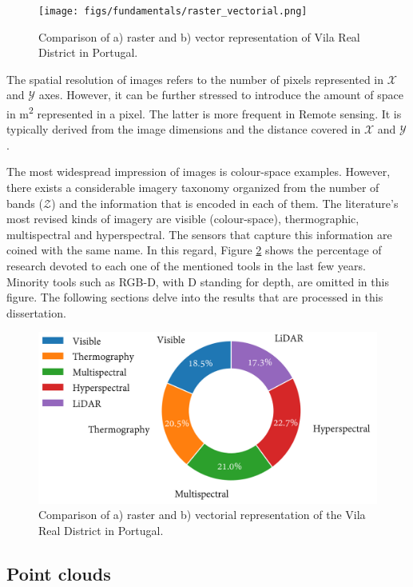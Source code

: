 \begin{figure}[!ht]
	\texttt{[image: figs/fundamentals/raster\_vectorial.png]}
	\caption{Comparison of a) raster and b) vector representation of Vila Real District in Portugal.  }
    \label{fig:raster_vectorial}
\end{figure}

The spatial resolution of images refers to the number of pixels represented in $\mathcal{X}$ and $\mathcal{Y}$ axes. However, it can be further stressed to introduce the amount of space in \si{\meter^2} represented in a pixel. The latter is more frequent in \gls{Remote sensing}. It is typically derived from the image dimensions and the distance covered in $\mathcal{X}$ and $\mathcal{Y}$.

The most widespread impression of images is colour-space examples. However, there exists a considerable imagery taxonomy organized from the number of bands ($\mathcal{Z}$) and the information that is encoded in each of them. The literature's most revised kinds of imagery are visible (colour-space), thermographic, multispectral and hyperspectral. The sensors that capture this information are coined with the same name. In this regard, Figure \ref{fig:sensor_literature} shows the percentage of research devoted to each one of the mentioned tools in the last few years. Minority tools such as RGB-D, with D standing for depth, are omitted in this figure. The following sections delve into the results that are processed in this dissertation. 

\begin{figure}[!ht]
	\includegraphics[width=.8\textwidth]{figs/fundamentals/literature_sensors.png}
	\caption{Comparison of a) raster and b) vectorial representation of the Vila Real District in Portugal.  }
    \label{fig:sensor_literature}
\end{figure}

\subsection{Point clouds}

